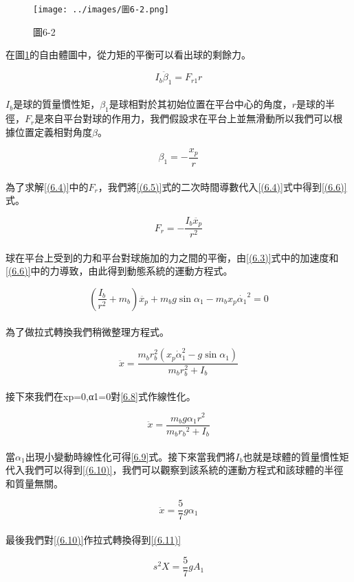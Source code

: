 \begin{figure}[h]
\centering
\texttt{[image: ../images/圖6-2.png]}
\caption{圖6-2}
\label{fig:6-2}
\end{figure}

在圖\ref{fig:6-2}的自由體圖中，從力矩的平衡可以看出球的剩餘力。

\begin{equation}
I_b \ddot{\beta}_1=F_{r1} r
\label{(6.4)}
\end{equation} \\

\(I_b\)是球的質量慣性矩，\(\beta_1\)是球相對於其初始位置在平台中心的角度，\(r\)是球的半徑，\(F_r\)是來自平台對球的作用力，我們假設求在平台上並無滑動所以我們可以根據位置定義相對角度\(\beta\)。

\begin{equation}
\beta_1=-\frac{x_p}{r}
\label{(6.5)}
\end{equation} \\

為了求解\ref{(6.4)}中的\(F_r\)，我們將\ref{(6.5)}式的二次時間導數代入\ref{(6.4)}式中得到\ref{(6.6)}式。

\begin{equation}
F_r=-\frac{I_b \ddot{x_p}}{r^2}
\label{(6.6)}
\end{equation} \\

球在平台上受到的力和平台對球施加的力之間的平衡，由\ref{(6.3)}式中的加速度和\ref{(6.6)}中的力導致，由此得到動態系統的運動方程式。

\begin{equation}
\left(\frac{I_b}{r^2}+m_b\right) \ddot{x_p}+m_b g \sin \alpha_1-m_b x_p{\dot{\alpha_1}}^2=0
\label{(6.7)}
\end{equation} \\

為了做拉式轉換我們稍微整理方程式。

\begin{equation}
\ddot{x}=\frac{m_b r_b^2\left(x_p \dot{\alpha}_1^2-g \sin \alpha_1\right)}{m_b r_b^2+I_b}
\label{(6.8)}
\end{equation} \\

接下來我們在xp=0,α1=0對\ref{6.8}式作線性化。

\begin{equation}
\ddot{x}=\frac{m_b g \alpha_1 r^2}{m_b r_b{ }^2+I_b}
\label{(6.9)}
\end{equation}\\

當\(\alpha_1\)出現小變動時線性化可得\ref{6.9}式。接下來當我們將\(I_b\)也就是球體的質量慣性矩代入我們可以得到\ref{(6.10)}，我們可以觀察到該系統的運動方程式和該球體的半徑和質量無關。

\begin{equation}
\ddot{x}=\frac{5}{7} g \alpha_1
\label{(6.10)}
\end{equation}\\

最後我們對\ref{(6.10)}作拉式轉換得到\ref{(6.11)}

\begin{equation}
s^2 X=\frac{5}{7} g A_1
\label{(6.11)}
\end{equation}\\